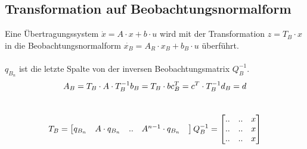\subsection{Transformation auf Beobachtungsnormalform}
Eine Übertragungssystem $\dot{x}=A\cdot x +  b \cdot u$ wird mit der Transformation  $z=T_B\cdot x$ in die Beobachtungsnormalform $\dot{x_B}=A_R\cdot x_B +  b_B \cdot u$ überführt.\\
\\
$q_{B_n}$ ist die letzte Spalte von der inversen Beobachtungsmatrix $Q_B^{-1}$.
\\
\[
	A_B = T_B\cdot A \cdot T_B^{-1}	\\	b_B = T_B\cdot b	\\	c_B^T = c^T\cdot T_B^{-1}	\\	d_B = d
\]
\\
\[
	T_B=
	\begin{bmatrix}
		q_{B_n} & A\cdot q_{B_n} &  ..& A^{n-1}\cdot q_{B_n} & \\
	\end{bmatrix}	\\
	Q_B^{-1} =
	\begin{bmatrix}
			 .. & .. & x\\
			 .. & .. & x\\
			 .. & .. & x\\	 
	\end{bmatrix}
\]

